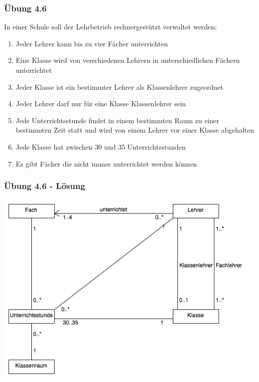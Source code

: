 \begin{frame}
\frametitle{Übung 4.6}
	In einer Schule soll der Lehrbetrieb rechnergestützt verwaltet werden:
	\begin{enumerate}
		\item Jeder Lehrer kann bis zu vier Fächer unterrichten
		\item Eine Klasse wird von verschiedenen Lehrern in unterschiedlichen Fächern unterrichtet
		\item Jeder Klasse ist ein bestimmter Lehrer als Klassenlehrer zugeordnet
		\item Jeder Lehrer darf nur für eine Klasse Klassenlehrer sein
		\item Jede Unterrichtsstunde findet in einem bestimmten Raum zu einer bestimmten Zeit statt
		und wird von einem Lehrer vor einer Klasse abgehalten
		\item Jede Klasse hat zwischen 30 und 35 Unterrichtsstunden
		\item Es gibt Fächer die nicht immer unterrichtet werden können
	\end{enumerate}
\end{frame}
\ifloesung
\begin{frame}
\frametitle{Übung 4.6 - Lösung}
	\includegraphics[width=1\textwidth,
	keepaspectratio=true]{bilder/klassend_aufg6_lsg.png}
\end{frame}
\fi
